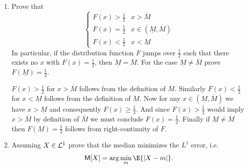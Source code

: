 \begin{exercise}
\begin{enumerate}[label=(\alph*), noitemsep]
        \item\label{it: characterization of distribution function} Prove that
        \[
            \begin{cases}
                F(x) > \tfrac12 & x > \overline{M} 
                \\
                F(x) = \tfrac12 & x \in (\underline{M}, \overline{M})
                \\
                F(x) < \tfrac12  & x < \underline{M}
            \end{cases}
        \]
        In particular, if the distribution function \(F\) jumps over
        \(\tfrac12\) such that there exists no \(x\) with \(F(x) = \frac12\),
        then \(\underline{M} = \overline{M}\). For the case
        \(\underline{M} \neq \overline{M}\) prove \(F(\underline{M})= \tfrac12\).
        \begin{solution}
            \(F(x) > \tfrac12\) for \(x>\overline{M}\) follows from the definition
            of \(\overline{M}\). Similarly \(F(x) < \tfrac12\) for \(x<\underline{M}\)
            follows from the definition of \(\underline{M}\). Now for any
            \(x \in (\underline{M}, \overline{M})\) we have \(x> \underline{M}\) and
            consequently \(F(x) \ge \tfrac12\). And since \(F(x) > \tfrac12\) would imply
            \(x > \overline{M}\) by definition of \(\overline{M}\) we must conclude
            \(F(x) = \tfrac12\). Finally if \(\underline{M} \neq \overline{M}\)
            then \(F(\underline{M}) = \tfrac12\) follows from right-continuity of \(F\).
        \end{solution}

		\item Assuming \(X\in \mathcal{L}^1\) prove that the median minimizes the \(L^1\) error, i.e.
        \[
            \mSym[X] =\arg\min_{m} \E{\abs{X-m}}.
        \]


\end{enumerate}
\end{exercise}
